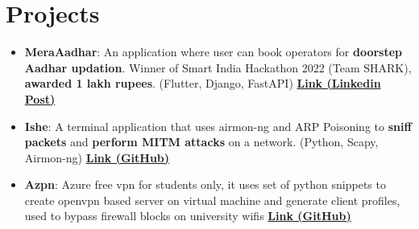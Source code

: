 \documentclass[letterpaper,11pt]{article}
\newcommand{\resumeItem}[2]{
  \item\small{
    \textbf{#1}{: #2 \vspace{-2pt}}
  }
}
\newcommand{\resumeSubItem}[2]{\resumeItem{#1}{#2}\vspace{-4pt}}
\newcommand{\resumeSubHeadingListStart}{\begin{itemize}[leftmargin=*]}
\newcommand{\resumeSubHeadingListEnd}{\end{itemize}}
\begin{document}
\section{Projects}
  \resumeSubHeadingListStart
      \resumeSubItem{MeraAadhar}
      {An application where user can book operators for \textbf{doorstep Aadhar updation}. Winner of Smart India Hackathon 2022 (Team SHARK), \textbf{awarded 1 lakh rupees}. (Flutter, Django, FastAPI) \href{https://www.linkedin.com/posts/hsk4link_sih-sih2022-smartindiahackathon-activity-6970324738409672704-YcQA/}{\textbf{Link (Linkedin Post)}}}
      \resumeSubItem{Ishe}
      {A terminal application that uses airmon-ng and ARP Poisoning to \textbf{sniff packets} and \textbf{perform MITM attacks} on a network. (Python, Scapy, Airmon-ng) \href{https://github.com/hari01584/ishe}{\textbf{Link (GitHub)}}}
      \resumeSubItem{Azpn}
      {Azure free vpn for students only, it uses set of python snippets to create openvpn based server on virtual machine and generate client profiles, used to bypass firewall blocks on university wifis \href{https://github.com/hari01584/Azpn-Azure-Free-VPN}{\textbf{Link (GitHub)}}}


  \resumeSubHeadingListEnd


\end{document}
